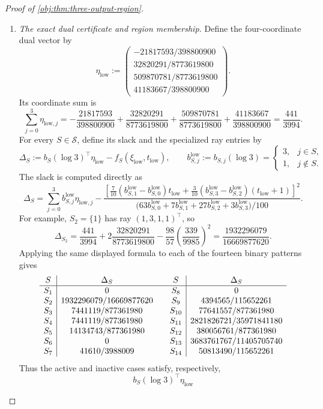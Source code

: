 \documentclass[11pt]{article}
\begin{document}
\begin{proof}[Proof of \cref{obj:thm:three-output-region}]
\begin{enumerate}
\item \textit{The exact dual certificate and region membership.}
Define the four-coordinate dual vector by
\[
\eta_{\mathrm{low}}:=
\begin{pmatrix}
-21817593/398800900\\
32820291/8773619800\\
509870781/8773619800\\
41183667/398800900
\end{pmatrix}.
\]
Its coordinate sum is
\[
\sum_{j=0}^3\eta_{\mathrm{low},j}
=
-\frac{21817593}{398800900}
+\frac{32820291}{8773619800}
+\frac{509870781}{8773619800}
+\frac{41183667}{398800900}
=\frac{441}{3994}.
\]
For every \(S\in\mathcal S\), define its slack and the specialized ray entries by
\[
\Delta_S:=
b_S(\log3)^\top\eta_{\mathrm{low}}
-f_S(\xi_{\mathrm{low}},t_{\mathrm{low}}),
\qquad
b^{\mathrm{low}}_{S,j}:=b_{S,j}(\log3)
=
\begin{cases}
3,&j\in S,\\
1,&j\notin S.
\end{cases}
\]
The slack is computed directly as
\[
\Delta_S
=
\sum_{j=0}^3 b^{\mathrm{low}}_{S,j}\eta_{\mathrm{low},j}
-
\frac{
\left[
\frac7{10}(b^{\mathrm{low}}_{S,1}-b^{\mathrm{low}}_{S,0})t_{\mathrm{low}}
+
\frac3{10}(b^{\mathrm{low}}_{S,3}-b^{\mathrm{low}}_{S,2})(t_{\mathrm{low}}+1)
\right]^2}
{
\bigl(
63b^{\mathrm{low}}_{S,0}
+7b^{\mathrm{low}}_{S,1}
+27b^{\mathrm{low}}_{S,2}
+3b^{\mathrm{low}}_{S,3}
\bigr)/100
}.
\]
For example, \(S_2=\{1\}\) has ray \((1,3,1,1)^\top\), so
\[
\Delta_{S_2}
=
\frac{441}{3994}
+2\frac{32820291}{8773619800}
-\frac{98}{57}\left(\frac{339}{9985}\right)^2
=
\frac{1932296079}{16669877620}.
\]
Applying the same displayed formula to each of the fourteen binary patterns gives
\[
\begin{array}{c|c@{\qquad}c|c}
S&\Delta_S&S&\Delta_S\\ \hline
S_1&0&S_8&0\\
S_2&1932296079/16669877620&S_9&4394565/115652261\\
S_3&7441119/877361980&S_{10}&77641557/877361980\\
S_4&7441119/877361980&S_{11}&2821826721/35971841180\\
S_5&14134743/877361980&S_{12}&380056761/877361980\\
S_6&0&S_{13}&3683761767/11405705740\\
S_7&41610/3988009&S_{14}&50813490/115652261
\end{array}
\]
Thus the active and inactive cases satisfy, respectively,
\[
b_S(\log3)^\top\eta_{\mathrm{low}}
\]
\end{enumerate}
\end{proof}
\end{document}
